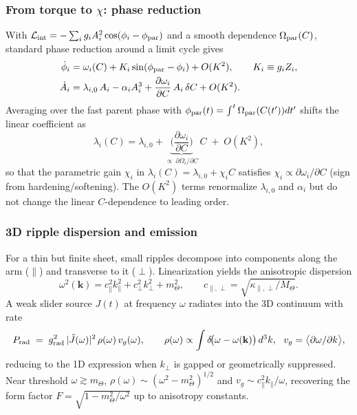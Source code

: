 \documentclass[11pt]{article}
\begin{document}
\subsubsection{From torque to $\chi$: phase reduction}\label{subsub:torque-chi}
With $\mathcal L_{\rm int}=-\sum_i g_i A_i^2 \cos(\phi_i-\phi_{\rm par})$ and a smooth dependence $\Omega_{\rm par}(C)$, standard phase reduction around a limit cycle gives
\begin{align}
\dot\phi_i &= \omega_i(C) + K_i \sin(\phi_{\rm par}-\phi_i) + O(K^2),\qquad K_i\equiv g_i Z_i,\\
\dot A_i &= \lambda_{i,0}\,A_i - \alpha_i A_i^3 + \frac{\partial \omega_i}{\partial C}\,A_i\,\delta C + O(K^2).
\end{align}
Averaging over the fast parent phase with $\phi_{\rm par}(t)=\int^t \Omega_{\rm par}(C(t'))dt'$ shifts the linear coefficient as
\begin{equation}
\lambda_i(C) = \lambda_{i,0} + \underbrace{\Big(\frac{\partial \omega_i}{\partial C}\Big)}_{\propto\ \partial\Omega_i/\partial C}\,C \;+\; O(K^2),
\end{equation}
so that the parametric gain $\chi_i$ in $\lambda_i(C)=\lambda_{i,0}+\chi_i C$ satisfies $\chi_i\propto \partial\omega_i/\partial C$ (sign from hardening/softening). The $O(K^2)$ terms renormalize $\lambda_{i,0}$ and $\alpha_i$ but do not change the linear $C$-dependence to leading order.

\subsubsection{3D ripple dispersion and emission}\label{subsub:3d-dispersion}
For a thin but finite sheet, small ripples decompose into components along the arm ($\parallel$) and transverse to it ($\perp$).
Linearization yields the anisotropic dispersion
\begin{equation}
\omega^2(\mathbf k)= c_\parallel^2 k_\parallel^2 + c_\perp^2 k_\perp^2 + m_\Theta^2,\qquad c_{\parallel,\perp}=\sqrt{\kappa_{\parallel,\perp}/M_\Theta}.
\end{equation}
A weak slider source $J(t)$ at frequency $\omega$ radiates into the 3D continuum with rate
\begin{equation}
P_{\rm rad} \;=\; g_{\rm rad}^2\,|\tilde J(\omega)|^2\,\rho(\omega)\,v_g(\omega),\qquad
\rho(\omega)\propto \int \delta\!\big(\omega-\omega(\mathbf k)\big)\,d^3k,\ \ v_g=\big\langle \partial \omega/\partial k \big\rangle,
\end{equation}
reducing to the 1D expression when $k_\perp$ is gapped or geometrically suppressed. Near threshold $\omega\gtrsim m_\Theta$, $\rho(\omega)\sim (\omega^2-m_\Theta^2)^{1/2}$ and $v_g\sim c_\parallel^2 k_\parallel/\omega$, recovering the form factor $F=\sqrt{1-m_\Theta^2/\omega^2}$ up to anisotropy constants.
\end{document}
